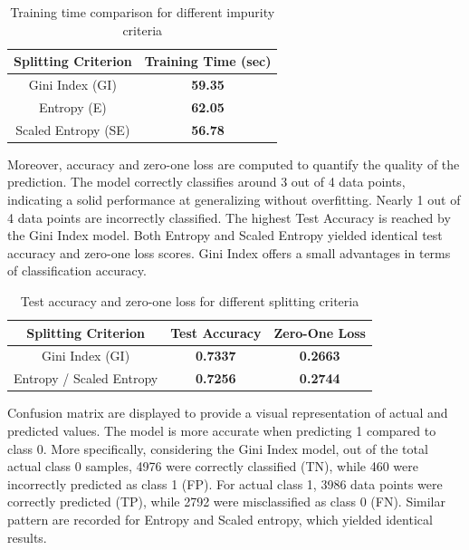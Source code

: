 \documentclass{article}
\begin{document}
\begin{table}[H]
\centering
\renewcommand{\arraystretch}{1.3}
\begin{tabular}{|c|c|}
\hline
\textbf{Splitting Criterion} & \textbf{Training Time (sec)} \\
\hline
Gini Index (GI)              & \textbf{59.35}               \\
Entropy (E)                  & \textbf{62.05}               \\
Scaled Entropy (SE)          & \textbf{56.78}               \\
\hline
\end{tabular}
\caption{Training time comparison for different impurity criteria}
\label{tab:training_times}
\end{table}

Moreover, accuracy and zero-one loss are computed to quantify the quality of the prediction. 
The model correctly classifies around 3 out of 4 data points, indicating a solid performance at generalizing without overfitting. Nearly 1 out of 4 data points are incorrectly classified. The highest Test Accuracy is reached by the Gini Index model. Both Entropy and Scaled Entropy yielded identical test accuracy and zero-one loss scores.
Gini Index offers a small advantages in terms of classification accuracy.

\begin{table}[H]
\centering
\renewcommand{\arraystretch}{1.3}
\begin{tabular}{|c|c|c|}
\hline
\textbf{Splitting Criterion} & \textbf{Test Accuracy} & \textbf{Zero-One Loss} \\
\hline
Gini Index (GI)              & \textbf{0.7337}         & \textbf{0.2663}         \\
Entropy / Scaled Entropy     & \textbf{0.7256}         & \textbf{0.2744}         \\
\hline
\end{tabular}
\caption{Test accuracy and zero-one loss for different splitting criteria}
\label{tab:test_accuracy}
\end{table}

Confusion matrix are displayed to provide a visual representation of actual and predicted values.
The model is more accurate when predicting 1 compared to class 0. More specifically, considering the Gini Index model, out of the total actual class 0 samples, 4976 were correctly classified (TN), while 460 were incorrectly predicted as class 1 (FP). For actual class 1, 3986 data points  were correctly predicted (TP), while 2792 were misclassified as class 0 (FN). Similar pattern are recorded for Entropy and Scaled entropy, which yielded identical results.
\end{document}
